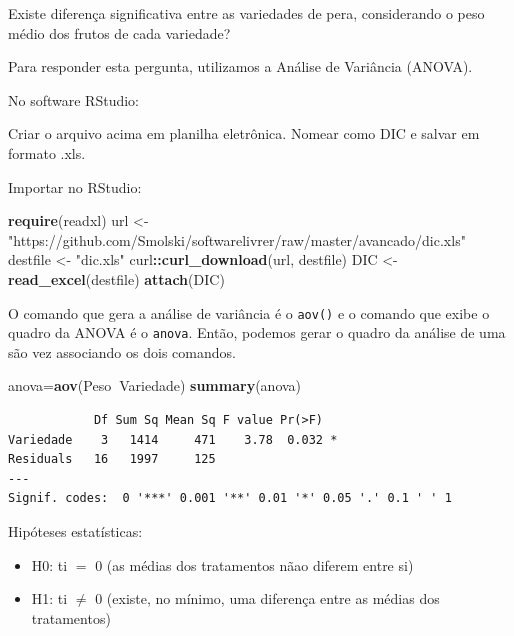 \documentclass[12pt,brazil,oneside]{book}
\newenvironment{Shaded}{\begin{snugshade}}{\end{snugshade}}
\newcommand{\KeywordTok}[1]{\textcolor[rgb]{0.13,0.29,0.53}{\textbf{#1}}}
\newcommand{\NormalTok}[1]{#1}
\newcommand{\OperatorTok}[1]{\textcolor[rgb]{0.81,0.36,0.00}{\textbf{#1}}}
\newcommand{\StringTok}[1]{\textcolor[rgb]{0.31,0.60,0.02}{#1}}
\providecommand{\tightlist}{%
  \setlength{\itemsep}{0pt}\setlength{\parskip}{0pt}}
\begin{document}
Existe diferença significativa entre as variedades de pera, considerando
o peso médio dos frutos de cada variedade?

Para responder esta pergunta, utilizamos a Análise de Variância (ANOVA).

No software RStudio:

Criar o arquivo acima em planilha eletrônica. Nomear como DIC e salvar
em formato .xls.

Importar no RStudio:

\begin{Shaded}
\begin{Highlighting}[]
\KeywordTok{require}\NormalTok{(readxl)}
\NormalTok{url <-}\StringTok{ "https://github.com/Smolski/softwarelivrer/raw/master/avancado/dic.xls"}
\NormalTok{destfile <-}\StringTok{ "dic.xls"}
\NormalTok{curl}\OperatorTok{::}\KeywordTok{curl_download}\NormalTok{(url, destfile)}
\NormalTok{DIC <-}\StringTok{ }\KeywordTok{read_excel}\NormalTok{(destfile)}
\KeywordTok{attach}\NormalTok{(DIC)}
\end{Highlighting}
\end{Shaded}

O comando que gera a análise de variância é o \texttt{aov()} e o comando
que exibe o quadro da ANOVA é o \texttt{anova}. Então, podemos gerar o
quadro da análise de uma são vez associando os dois comandos.

\begin{Shaded}
\begin{Highlighting}[]
\NormalTok{anova=}\KeywordTok{aov}\NormalTok{(Peso}\OperatorTok{~}\NormalTok{Variedade)}
\KeywordTok{summary}\NormalTok{(anova)}
\end{Highlighting}
\end{Shaded}

\begin{verbatim}
            Df Sum Sq Mean Sq F value Pr(>F)  
Variedade    3   1414     471    3.78  0.032 *
Residuals   16   1997     125                 
---
Signif. codes:  0 '***' 0.001 '**' 0.01 '*' 0.05 '.' 0.1 ' ' 1
\end{verbatim}

Hipóteses estatísticas:

\begin{itemize}
\tightlist
\item
  H0: ti \(=\) 0 (as médias dos tratamentos nãao diferem entre si)
\item
  H1: ti \(\neq\) 0 (existe, no mínimo, uma diferença entre as médias
  dos tratamentos)
\end{itemize}
\end{document}
